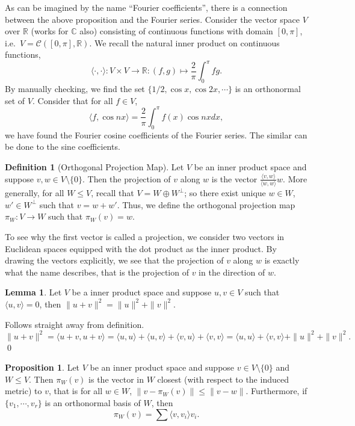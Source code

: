 \documentclass[
]{article}
\theoremstyle{definition}
\newtheorem{prop}{Proposition}[section]
\newtheorem{lemma}{Lemma}[section]
\theoremstyle{definition}
\newtheorem{definition}{Definition}[section]
\begin{document}
As can be imagined by the name ``Fourier coefficients'', there is a
connection between the above proposition and the Fourier series.
Consider the vector space \(V\) over \(\mathbb{R}\) (works for
\(\mathbb{C}\) also) consisting of continuous functions with domain
\([0, \pi]\), i.e.~\(V = \mathcal{C}([0, \pi], \mathbb{R})\). We recall
the natural inner product on continuous functions,
\[\langle \cdot, \cdot \rangle : V \times V \to \mathbb{R} : 
  (f, g) \mapsto \frac{2}{\pi} \int_0^\pi fg.\] By manually checking, we
find the set \(\{1 / 2, \cos x, \cos 2x, \cdots \}\) is an orthonormal
set of \(V\). Consider that for all \(f \in V\),
\[\langle f, \cos n x \rangle = \frac{2}{\pi} \int_0^\pi f(x) \cos nx dx,\]
we have found the Fourier cosine coefficients of the Fourier series. The
similar can be done to the sine coefficients.

\begin{definition}[Orthogonal Projection Map]
  Let \(V\) be an inner product space and suppose \(v, w \in V \setminus \{0\}\).
  Then the projection of \(v\) along \(w\) is the vector
  \(\frac{\langle v, w \rangle}{\langle w, w \rangle} w\). More generally, 
  for all \(W \le V\), recall that \(V = W \oplus W^\bot\); so there exist unique 
  \(w \in W\), \(w' \in W^\bot\) such that \(v = w + w'\). Thus, we define the 
  orthogonal projection map \(\pi_W : V \to W\) such that \(\pi_W(v) = w\). 
\end{definition}

To see why the first vector is called a projection, we consider two
vectors in Euclidean spaces equipped with the dot product as the inner
product. By drawing the vectors explicitly, we see that the projection
of \(v\) along \(w\) is exactly what the name describes, that is the
projection of \(v\) in the direction of \(w\).

\begin{lemma}
  Let \(V\) be a inner product space and suppose \(u, v \in V\) such that 
  \(\langle u, v \rangle = 0\), then \(\|u + v\|^2 = \|u\|^2 + \|v\|^2\). 
\end{lemma}
\proof

Follows straight away from definition.
\[\|u + v\|^2 = \langle u + v, u + v \rangle = 
    \langle u, u \rangle + \langle u, v \rangle + \langle v, u \rangle +
    \langle v, v \rangle = \langle u, u \rangle + \langle v, v \rangle + 
    \|u\|^2 + \|v\|^2.\] \qed

\begin{prop}
  Let \(V\) be an inner product space and suppose \(v \in V \setminus \{0\}\) 
  and \(W \le V\). Then \(\pi_W(v)\) is the vector in \(W\) closest (with respect 
  to the induced metric) to \(v\), that is for all \(w \in W\), 
  \(\| v - \pi_W(v) \| \le \| v - w \|\). Furthermore, if \(\{v_1, \cdots, v_r\}\) 
  is an orthonormal basis of \(W\), then 
  \[\pi_W(v) = \sum \langle v, v_i \rangle v_i.\]
\end{prop}
\proof
\end{document}
